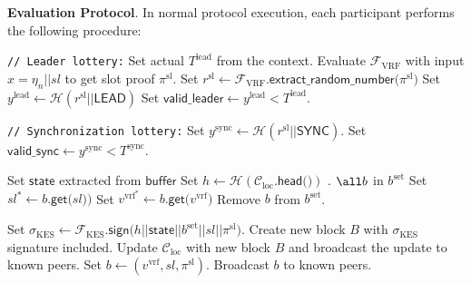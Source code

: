 \bigbreak
\noindent
\textbf{Evaluation Protocol}.
In normal protocol execution, each participant performs the following procedure:
\begin{protocol}
    \caption{$\textsf{EvaluationProcedure}(P, R, sl, \textsf{buffer}, \textsf{syncBuffer}, \mathcal{C}_{\text{loc}})$}
    \begin{algorithmic}[1]

        \noindent
        \lstinline|// Leader lottery:|
        \State Set actual $T^{\text{lead}}$ from the \textsf{context}.
        \State Evaluate $\mathcal{F}_{\text{VRF}}$ with input $x = \eta_n|| sl$ to get slot proof $\pi^{\text{sl}}$.
        \State Set ${r^{\text{sl}} \leftarrow \mathcal{F}_{\text{VRF}}\textsf{.extract\_random\_number(}\pi^{\text{sl}}\textsf{)}}$
        \State Set ${y^{\text{lead}} \leftarrow {\mathcal{H}(r^{\text{sl}} || \textsf{LEAD})}}$
        \State Set ${\textsf{valid\_leader} \leftarrow y^{\text{lead}} < T^{\text{lead}}}$.

        \noindent
        \lstinline|// Synchronization lottery:|
        \State Set ${y^{\text{sync}} \leftarrow {\mathcal{H}(r^{\text{sl}} || \textsf{SYNC})}}$.
        \State Set ${\textsf{valid\_sync} \leftarrow y^{\text{sync}} < T^{\text{sync}}}$.

            \State Set $\textsf{state}$ extracted from $\textsf{buffer}$
            \State Set $h \leftarrow \mathcal{H}(\mathcal{C}_{\text{loc}}\textsf{.head()})$
                .
                \For
                {$\all b$ in $b^{\text{set}}$}
                    \State Set $sl^* \leftarrow b.\textsf{get(} sl \textsf{)})$
                    \State Set $v^{\text{vrf}}^* \leftarrow b.\textsf{get(} v^{\text{vrf}} \textsf{)}$
                        \State Remove $b$ from $b^{\text{set}}$.
                    \EndIf

                \EndFor
            \EndIf
            \State Set $\sigma_{\text{KES}} \leftarrow \mathcal{F}_{\text{KES}}\textsf{.sign(} h || \textsf{state} || b^{\text{set}} || sl || \pi^{\text{sl}} \textsf{)}$.
            \State Create new block $B$ with $\sigma_{\text{KES}}$ signature included.
            \State Update $\mathcal{C}_{\text{loc}}$ with new block $B$ and broadcast the update to known peers.
        \EndIf
                \State Set $b \leftarrow (v^{\text{vrf}}, sl, \pi^{\text{sl}})$.
                \State Broadcast $b$ to known peers.


\end{algorithmic}
\end{protocol}
